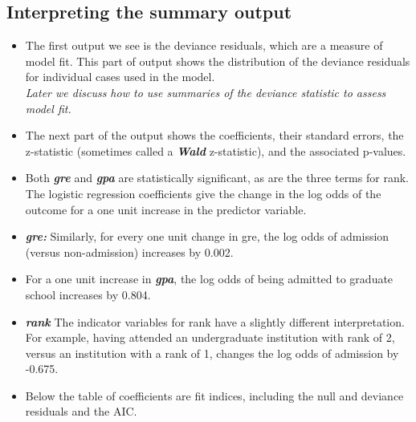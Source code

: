 \documentclass[]{article}
\begin{document}
\subsection{Interpreting the summary output}
\begin{itemize}
\item The first output we see is the deviance residuals, which are a measure of model fit. This part of output shows the distribution of the deviance residuals for individual cases used in the model. \\ \textit{Later we discuss how to use summaries of the deviance statistic to assess model fit.}
\item The next part of the output shows the coefficients, their standard errors, the z-statistic (sometimes called a \textbf{\textit{Wald} }z-statistic), and the associated p-values. 
\item
Both \textbf{\textit{gre}} and \textbf{\textit{gpa}} are statistically significant, as are the three terms for rank. The logistic regression coefficients give the change in the log odds of the outcome for a one unit increase in the predictor variable.
\item \textbf{\textit{gre:}} Similarly, for every one unit change in gre, the log odds of admission (versus non-admission) increases by 0.002.
\item 
For a one unit increase in \textbf{\textit{gpa}}, the log odds of being admitted to graduate school increases by 0.804.
\item \textbf{\textit{rank}}
The indicator variables for rank have a slightly different interpretation. For example, having attended an undergraduate institution with rank of 2, versus an institution with a rank of 1, changes the log odds of admission by -0.675.
\item Below the table of coefficients are fit indices, including the null and deviance residuals and the AIC.
\end{itemize}
\newpage
\end{document}
